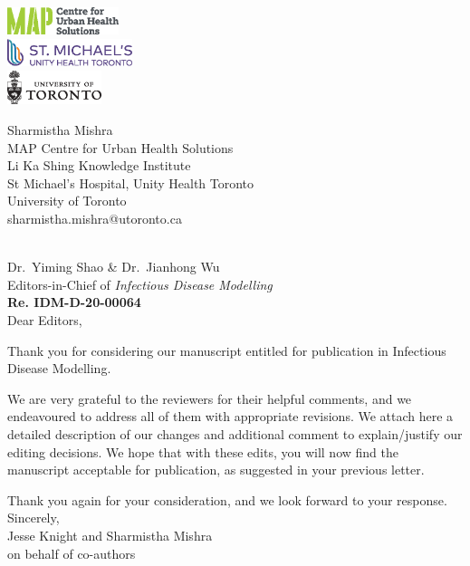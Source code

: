 \documentclass{article}
\begin{document}
\begin{minipage}{0.5\linewidth}
  \includegraphics[height=0.8cm]{map-cuhs.eps}\\[1ex]
  \includegraphics[height=0.8cm]{smh.eps}     \\[1ex]
  \includegraphics[height=1.0cm]{uoft.eps}
\end{minipage}%
\begin{minipage}{0.5\linewidth}
  \begin{flushright}\small
    Sharmistha Mishra\\
    MAP Centre for Urban Health Solutions\\
    Li Ka Shing Knowledge Institute\\
    St Michael's Hospital,
    Unity Health Toronto\\
    University of Toronto\\
    sharmistha.mishra@utoronto.ca
  \end{flushright}
\end{minipage}
\\[3ex]
Dr.\ Yiming Shao \& Dr.\ Jianhong Wu\\
Editors-in-Chief of \textit{Infectious Disease Modelling}\\[2ex]
\textbf{Re. IDM-D-20-00064}\\[1em]
Dear Editors,
\par
Thank you for considering our manuscript entitled
\emph{\unskip} for publication in Infectious Disease Modelling.
\par
We are very grateful to the reviewers for their helpful comments,
and we endeavoured to address all of them with appropriate revisions.
We attach here a detailed description of our changes
and additional comment to explain/justify our editing decisions.
We hope that with these edits, you will now find the manuscript acceptable for publication,
as suggested in your previous letter.
\par
Thank you again for your consideration, and we look forward to your response.
\\[2em]
Sincerely,\\[1em]
Jesse Knight and Sharmistha Mishra\\
on behalf of co-authors
\clearpage

\end{document}
